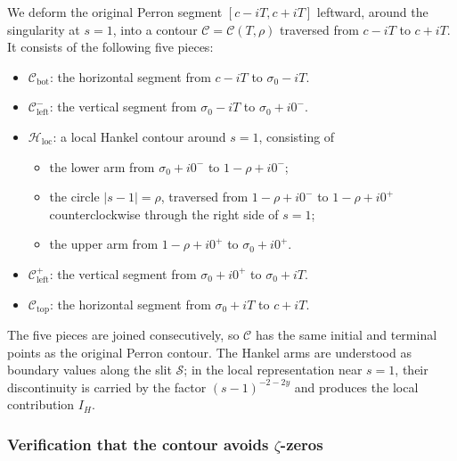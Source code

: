 We deform the original Perron segment $[c-iT,c+iT]$ leftward,
around the singularity at $s=1$, into a contour
$\mathcal C=\mathcal C(T,\rho)$ traversed from $c-iT$ to $c+iT$.
It consists of the following five pieces:
\begin{itemize}
    \item[(1)] $\mathcal C_{\mathrm{bot}}$: the horizontal segment
    from $c-iT$ to $\sigma_0-iT$.

    \item[(2)] $\mathcal C_{\mathrm{left}}^-$: the vertical segment
    from $\sigma_0-iT$ to $\sigma_0+i0^-$.

    \item[(3)] $\mathcal H_{\mathrm{loc}}$: a local Hankel contour
    around $s=1$, consisting of
    \begin{itemize}
        \item[(3a)] the lower arm from $\sigma_0+i0^-$ to
        $1-\rho+i0^-$;

        \item[(3b)] the circle $|s-1|=\rho$, traversed from
        $1-\rho+i0^-$ to $1-\rho+i0^+$ counterclockwise through
        the right side of $s=1$;

        \item[(3c)] the upper arm from $1-\rho+i0^+$ to
        $\sigma_0+i0^+$.
    \end{itemize}

    \item[(4)] $\mathcal C_{\mathrm{left}}^+$: the vertical segment
    from $\sigma_0+i0^+$ to $\sigma_0+iT$.

    \item[(5)] $\mathcal C_{\mathrm{top}}$: the horizontal segment
    from $\sigma_0+iT$ to $c+iT$.
\end{itemize}
The five pieces are joined consecutively, so $\mathcal C$ has the
same initial and terminal points as the original Perron contour.
The Hankel arms are understood as boundary values along the slit
$\mathcal S$; in the local representation near $s=1$, their
discontinuity is carried by the factor $(s-1)^{-2-2y}$ and produces
the local contribution $I_H$.

\subsubsection*{Verification that the contour avoids \texorpdfstring{$\zeta$}{zeta}-zeros}

